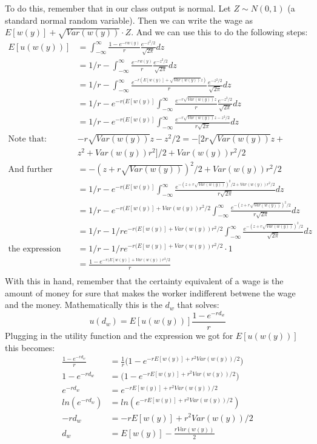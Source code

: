 \documentclass{article}
\begin{document}
To do this, remember that in our class output is normal. Let $Z \sim N(0,1)$ (a standard normal random variable). Then we can write the wage as $E[w(y)]+ \sqrt{Var(w(y))} \cdot Z$. And we can use this to do the following steps:
\begin{align*}
  E[u(w(y))] &= \int^{\infty}_{-\infty}  \frac{1-e^{-r w(y)}}{r} \frac{e^{-z^2/2}}{\sqrt{2 \pi}} dz\\
              &= 1/r -\int^{\infty}_{-\infty}  \frac{e^{-r w(y)}}{r} \frac{e^{-z^2/2}}{\sqrt{2 \pi}} dz\\
              &= 1/r -\int^{\infty}_{-\infty}  \frac{e^{-r(E[w(y)]+ \sqrt{Var(w(y))}z) }}{r} \frac{e^{-z^2/2}}{\sqrt{2 \pi}} dz\\
            &= 1/r -e^{-r(E[w(y)]}\int^{\infty}_{-\infty}  \frac{e^{-r\sqrt{Var(w(y))}z }}{r} \frac{e^{-z^2/2}}{\sqrt{2 \pi}} dz\\
                     &= 1/r -e^{-r(E[w(y)]}\int^{\infty}_{-\infty}  \frac{e^{-r\sqrt{Var(w(y))}z -z^2/2}}{r\sqrt{2 \pi}} dz\\
\text{Note that: }& -r\sqrt{Var(w(y))}z -z^2/2 = -[2r\sqrt{Var(w(y))}z +\\
& z^2+Var(w(y))r^2]/2 + Var(w(y))r^2/2\\
\text{And further that:}&  = -(z+r\sqrt{Var(w(y))})^2/2  + Var(w(y))r^2/2\\
               &= 1/r -e^{-r(E[w(y)]}\int^{\infty}_{-\infty}  \frac{e^{-(z+r\sqrt{Var(w(y))})^2/2  + Var(w(y))r^2/2}}{r\sqrt{2 \pi}} dz\\
               &= 1/r -e^{-r(E[w(y)]+ Var(w(y))r^2/2}\int^{\infty}_{-\infty}  \frac{e^{-(z+r\sqrt{Var(w(y))})^2/2 }}{r\sqrt{2 \pi}} dz\\
                &= 1/r -1/re^{-r(E[w(y)]+ Var(w(y))r^2/2}\int^{\infty}_{-\infty}  \frac{e^{-(z+r\sqrt{Var(w(y))})^2/2 }}{\sqrt{2 \pi}} dz\\
 \text{the expression inside is a density:}&= 1/r -1/re^{-r(E[w(y)]+ Var(w(y))r^2/2} \cdot 1\\
 &= \frac{1-e^{-r(E[w(y)]+ Var(w(y))r^2/2}}{r} \\
\end{align*}
With this in hand, remember that the certainty equivalent of a wage is the amount of money for sure that makes the worker indifferent betwene the wage and the money. Mathematically this is the $d_w$ that solves:
\[u(d_w) = E [u(w(y))]   \frac{1-e^{-r d_w}}{r}  \]
Plugging in the utility function and the expression we got for $E [u(w(y))] $ this becomes:
\begin{align*}
      \frac{1-e^{-r d_w}}{r} &= \frac{1}{r} \bigg ( 1-e^{-r E[w(y)]+r^2 Var(w(y))/2} \bigg )\\
       1-e^{-r d_w}&=\bigg ( 1-e^{-r E[w(y)]+r^2 Var(w(y))/2} \bigg )\\
       e^{-r d_w}&=e^{-r E[w(y)]+r^2 Var(w(y))/2}\\
        ln(e^{-r d_w})&=ln(e^{-r E[w(y)]+r^2 Var(w(y))/2})\\
        -r d_w&=-r E[w(y)]+r^2 Var(w(y))/2\\
        d_w&= E[w(y)]-\frac{r Var(w(y))}{2}\\
\end{align*}
\end{document}
